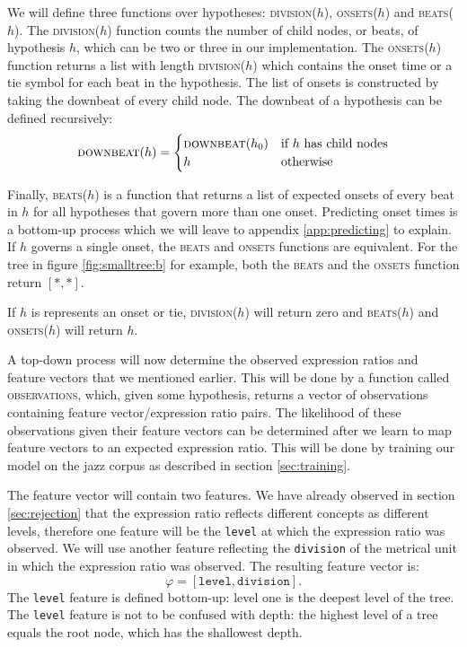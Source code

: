 We will define three functions over hypotheses: \textsc{division}($h$), \textsc{onsets}($h$) and \textsc{beats}($h$). The \textsc{division}($h$) function counts the number of child nodes, or beats, of hypothesis $h$, which can be two or three in our implementation. The \textsc{onsets}($h$) function returns a list with length \textsc{division}($h$) which contains the onset time or a tie symbol for each beat in the hypothesis. The list of onsets is constructed by taking the downbeat of every child node. The downbeat of a hypothesis can be defined recursively:
\begin{equation}
\textsc{downbeat}(h) = 
\begin{cases}
   \textsc{downbeat}(h_0) & \mbox{if $h$ has child nodes}\\
   h & \mbox{otherwise}\\
  \end{cases}
\end{equation}

Finally, \textsc{beats}($h$) is a function that returns a list of expected onsets of every beat in $h$ for all hypotheses that govern more than one onset. Predicting onset times is a bottom-up process which we will leave to appendix \ref{app:predicting} to explain. If $h$ governs a single onset, the \textsc{beats} and \textsc{onsets} functions are equivalent. For the tree in figure \ref{fig:smalltree:b} for example, both the \textsc{beats} and the \textsc{onsets} function return $[*, *]$. 

If $h$ is represents an onset or tie, \textsc{division}($h$) will return zero and \textsc{beats}($h$) and \textsc{onsets}($h$)
will return $h$.

A top-down process will now determine the observed expression ratios and feature vectors that we mentioned earlier. This will be done by a function called \textsc{observations}, which, given some hypothesis, returns a vector of observations containing feature vector/expression ratio pairs. The likelihood of these observations given their feature vectors can be determined after we learn to map feature vectors to an expected expression ratio. This will be done by training our model on the jazz corpus as described in section \ref{sec:training}.

The feature vector will contain two features. We have already observed in section \ref{sec:rejection} that the expression ratio reflects different concepts as different levels, therefore one feature will be the \texttt{level} at which the expression ratio was observed. We will use another feature reflecting the \texttt{division} of the metrical unit in which the expression ratio was observed. The resulting feature vector is:
\begin{equation}
\label{eq:features}
\varphi = [\texttt{level}, \texttt{division}].
\end{equation}
The \texttt{level} feature is defined bottom-up: level one is the deepest level of the tree. The \texttt{level} feature is not to be confused with depth: the highest level of a tree equals the root node, which has the shallowest depth.

